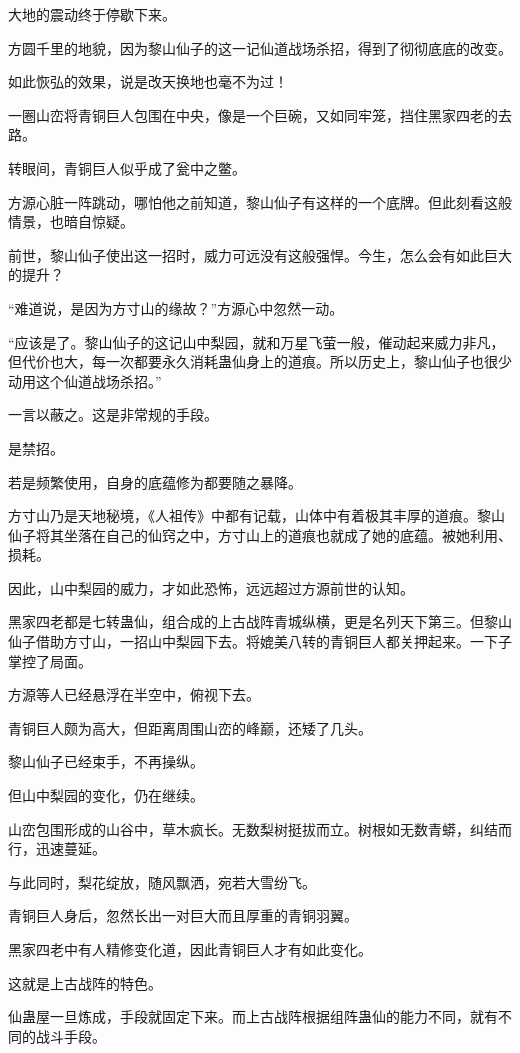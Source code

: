\begin{this_body}
大地的震动终于停歇下来。

方圆千里的地貌，因为黎山仙子的这一记仙道战场杀招，得到了彻彻底底的改变。

如此恢弘的效果，说是改天换地也毫不为过！

一圈山峦将青铜巨人包围在中央，像是一个巨碗，又如同牢笼，挡住黑家四老的去路。

转眼间，青铜巨人似乎成了瓮中之鳖。

方源心脏一阵跳动，哪怕他之前知道，黎山仙子有这样的一个底牌。但此刻看这般情景，也暗自惊疑。

前世，黎山仙子使出这一招时，威力可远没有这般强悍。今生，怎么会有如此巨大的提升？

“难道说，是因为方寸山的缘故？”方源心中忽然一动。

“应该是了。黎山仙子的这记山中梨园，就和万星飞萤一般，催动起来威力非凡，但代价也大，每一次都要永久消耗蛊仙身上的道痕。所以历史上，黎山仙子也很少动用这个仙道战场杀招。”

一言以蔽之。这是非常规的手段。

是禁招。

若是频繁使用，自身的底蕴修为都要随之暴降。

方寸山乃是天地秘境，《人祖传》中都有记载，山体中有着极其丰厚的道痕。黎山仙子将其坐落在自己的仙窍之中，方寸山上的道痕也就成了她的底蕴。被她利用、损耗。

因此，山中梨园的威力，才如此恐怖，远远超过方源前世的认知。

黑家四老都是七转蛊仙，组合成的上古战阵青城纵横，更是名列天下第三。但黎山仙子借助方寸山，一招山中梨园下去。将媲美八转的青铜巨人都关押起来。一下子掌控了局面。

方源等人已经悬浮在半空中，俯视下去。

青铜巨人颇为高大，但距离周围山峦的峰巅，还矮了几头。

黎山仙子已经束手，不再操纵。

但山中梨园的变化，仍在继续。

山峦包围形成的山谷中，草木疯长。无数梨树挺拔而立。树根如无数青蟒，纠结而行，迅速蔓延。

与此同时，梨花绽放，随风飘洒，宛若大雪纷飞。

青铜巨人身后，忽然长出一对巨大而且厚重的青铜羽翼。

黑家四老中有人精修变化道，因此青铜巨人才有如此变化。

这就是上古战阵的特色。

仙蛊屋一旦炼成，手段就固定下来。而上古战阵根据组阵蛊仙的能力不同，就有不同的战斗手段。


\end{this_body}
